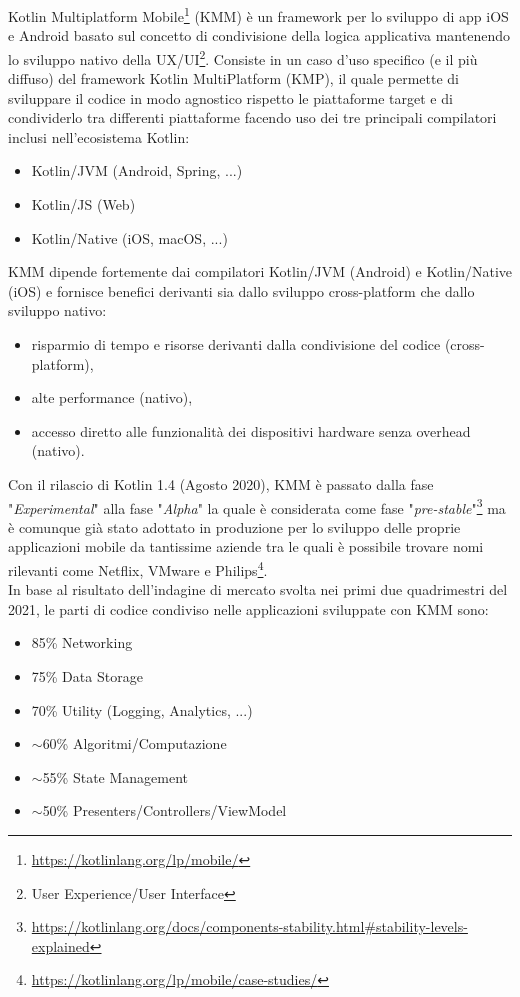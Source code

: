 \parindent=0pt
Kotlin Multiplatform Mobile\footnote{\url{https://kotlinlang.org/lp/mobile/}} (KMM) è un framework per lo sviluppo di app iOS e Android basato sul concetto di condivisione della logica applicativa mantenendo lo sviluppo nativo della UX/UI\footnote{User Experience/User Interface}. Consiste in un caso d'uso specifico (e il più diffuso) del framework Kotlin MultiPlatform (KMP), il quale permette di sviluppare il codice in modo agnostico rispetto le piattaforme target e di condividerlo tra differenti piattaforme facendo uso dei tre principali compilatori inclusi nell'ecosistema Kotlin\cite{nagy2022simplifying}:
\begin{itemize}
    \item Kotlin/JVM (Android, Spring, ...)
    \item Kotlin/JS (Web)
    \item Kotlin/Native (iOS, macOS, ...)
\end{itemize}
KMM dipende fortemente dai compilatori Kotlin/JVM (Android) e Kotlin/Native (iOS) e fornisce benefici derivanti sia dallo sviluppo cross-platform che dallo sviluppo nativo:
\begin{itemize}
    \item risparmio di tempo e risorse derivanti dalla condivisione del codice (cross-platform),
    \item alte performance (nativo),
    \item accesso diretto alle funzionalità dei dispositivi hardware senza overhead (nativo).
\end{itemize}
Con il rilascio di Kotlin 1.4 (Agosto 2020), KMM è passato dalla fase "\textit{Experimental}" alla fase "\textit{Alpha}" la quale è considerata come fase "\textit{pre-stable}"\footnote{\url{https://kotlinlang.org/docs/components-stability.html\#stability-levels-explained}} ma è comunque già stato adottato in produzione per lo sviluppo delle proprie applicazioni mobile da tantissime aziende tra le quali è possibile trovare nomi rilevanti come Netflix, VMware e Philips\footnote{\url{https://kotlinlang.org/lp/mobile/case-studies/}}.\\
In base al risultato dell'indagine di mercato svolta nei primi due quadrimestri del 2021\cite{kmm2}, le parti di codice condiviso nelle applicazioni sviluppate con KMM sono:
\begin{itemize}
    \item 85\% Networking
    \item 75\% Data Storage
    \item 70\% Utility (Logging, Analytics, ...)
    \item $\sim$60\% Algoritmi/Computazione
    \item $\sim$55\% State Management
    \item $\sim$50\% Presenters/Controllers/ViewModel
\end{itemize}

